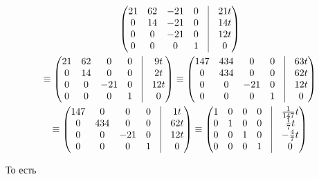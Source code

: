 \documentclass[12pt, a4paper]{article}
\begin{document}
\begin{multline}
\begin{pmatrix}
            21 & 62 & -21 & 0 & \vrule & 21t \\
            0 & 14  & -21 & 0 & \vrule & 14t \\
            0 & 0   & -21 & 0 & \vrule & 12t \\
            0 & 0   & 0  & 1 & \vrule & 0
        \end{pmatrix} \\ \equiv \begin{pmatrix}
            21 & 62 & 0   & 0 & \vrule & 9t \\
            0 & 14  & 0   & 0 & \vrule & 2t \\
            0 & 0   & -21 & 0 & \vrule & 12t \\
            0 & 0   & 0   & 1 & \vrule & 0
        \end{pmatrix} \equiv \begin{pmatrix}
            147 & 434 & 0   & 0 & \vrule & 63t \\
            0 & 434  & 0   & 0 & \vrule & 62t \\
            0 & 0   & -21 & 0 & \vrule & 12t \\
            0 & 0   & 0   & 1 & \vrule & 0
        \end{pmatrix} \\ \equiv \begin{pmatrix}
            147 & 0 & 0   & 0 & \vrule & 1t \\
            0 & 434  & 0   & 0 & \vrule & 62t \\
            0 & 0   & -21 & 0 & \vrule & 12t \\
            0 & 0   & 0   & 1 & \vrule & 0
        \end{pmatrix} \equiv \begin{pmatrix}
            1 & 0 & 0   & 0 & \vrule & \frac{1}{147} t \\
            0 & 1  & 0   & 0 & \vrule & \frac17 t \\
            0 & 0   & 1 & 0 & \vrule & - \frac{4}{7}t \\
            0 & 0   & 0   & 1 & \vrule & 0
        \end{pmatrix}
    \end{multline}

    То есть
\end{document}
